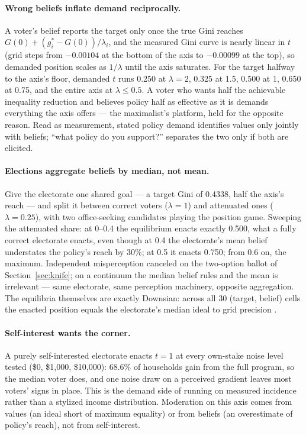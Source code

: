 \documentclass[11pt]{article}
\begin{document}
\paragraph{Wrong beliefs inflate demand reciprocally.} A voter's belief
reports the target only once the true Gini reaches
\(G(0) + (g^*_i - G(0))/\lambda_i\), and the measured Gini curve is
nearly linear in \(t\) (grid steps from \(-0.00104\) at the bottom of
the axis to \(-0.00099\) at the top), so demanded position scales as
\(1/\lambda\) until the axis saturates. For the target halfway to the
axis's floor, demanded \(t\) runs 0.250 at \(\lambda = 2\), 0.325 at
1.5, 0.500 at 1, 0.650 at 0.75, and the entire axis at
\(\lambda \le 0.5\). A voter who wants half the achievable inequality
reduction and believes policy half as effective as it is demands
everything the axis offers --- the maximalist's platform, held for the
opposite reason. Read as measurement, stated policy demand identifies
values only jointly with beliefs; ``what policy do you support?''
separates the two only if both are elicited.

\paragraph{Elections aggregate beliefs by median, not mean.} Give the
electorate one shared goal --- a target Gini of 0.4338, half the axis's
reach --- and split it between correct voters (\(\lambda = 1\)) and
attenuated ones (\(\lambda = 0.25\)), with two office-seeking
candidates playing the position game. Sweeping the attenuated share: at
0--0.4 the equilibrium enacts exactly 0.500, what a fully correct
electorate enacts, even though at 0.4 the electorate's mean belief
understates the policy's reach by 30\%; at 0.5 it enacts 0.750; from
0.6 on, the maximum. Independent misperception canceled on the
two-option ballot of Section~\ref{sec:knife}; on a continuum the median
belief rules and the mean is irrelevant --- same electorate, same
perception machinery, opposite aggregation. The equilibria themselves
are exactly Downsian: across all 30 (target, belief) cells the enacted
position equals the electorate's median ideal to grid precision
\citep{downs1957}.

\paragraph{Self-interest wants the corner.} A purely self-interested
electorate enacts \(t = 1\) at every own-stake noise level tested
(\$0, \$1{,}000, \$10{,}000): 68.6\% of households gain from the full
program, so the median voter does, and one noise draw on a perceived
gradient leaves most voters' signs in place. This is the demand side of
\citet{meltzer1981} running on measured incidence rather than a
stylized income distribution. Moderation on this axis comes from values
(an ideal short of maximum equality) or from beliefs (an overestimate
of policy's reach), not from self-interest.
\end{document}
